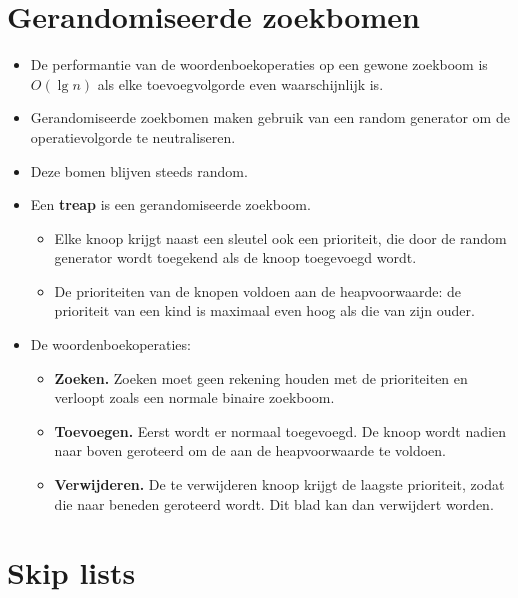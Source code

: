 \section{Gerandomiseerde zoekbomen}
\label{sec:gerandomiseerde-zoekbomen}
\begin{itemize}
    \item De performantie van de woordenboekoperaties op een gewone zoekboom is $O(\lg n)$ als elke toevoegvolgorde even waarschijnlijk is.
    \item Gerandomiseerde zoekbomen maken gebruik van een random generator om de operatievolgorde te neutraliseren.
    \item Deze bomen blijven steeds random.
    \item Een \textbf{treap} is een gerandomiseerde zoekboom.
    \begin{itemize}
        \item Elke knoop krijgt naast een sleutel ook een prioriteit, die door de random generator wordt toegekend als de knoop toegevoegd wordt.
        \item De prioriteiten van de knopen voldoen aan de heapvoorwaarde: de prioriteit van een kind is maximaal even hoog als die van zijn ouder.
    \end{itemize}
    \item De woordenboekoperaties:
    \begin{itemize}
        \item \textbf{Zoeken.}  Zoeken moet geen rekening houden met de prioriteiten en verloopt zoals een normale binaire zoekboom.
        \item \textbf{Toevoegen.} Eerst wordt er normaal toegevoegd. De knoop wordt nadien naar boven geroteerd om de aan de heapvoorwaarde te voldoen.
        \item \textbf{Verwijderen.} De te verwijderen knoop krijgt de laagste prioriteit, zodat die naar beneden geroteerd wordt. Dit blad kan dan verwijdert worden.
    \end{itemize}
\end{itemize}

\section{Skip lists}
